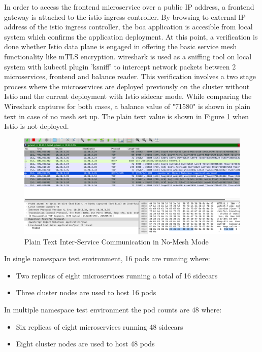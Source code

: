 In order to access the frontend microservice over a public IP address, a frontend gateway is attached to the istio ingress controller. By browsing to external IP address of the istio ingress controller, the \acrshort{boa} application is accesible from local system which confirms the application deployment. At this point, a verification is done whether Istio data plane is engaged in offering the basic service mesh functionality like mTLS encryption. \gls{wireshark} is used as a sniffing tool on local system with kubectl plugin 'ksniff' to intercept network packets between 2 microservices, frontend and balance reader. This verification involves a two stage process where the microservices are deployed previously on the cluster without Istio and the current deployment with Istio sidecar mode. While comparing the Wireshark captures for both cases, a balance value of "71580" is shown in plain text in case of no mesh set up. The plain text value is shown in Figure \ref{method:plainTxtWiresharkView} when Istio is not deployed.

\begin{figure}[ht!]
    \centering
    \includegraphics[width=1.0\linewidth]{resources/raw-balance-value.png}
    \caption{Plain Text Inter-Service Communication in No-Mesh Mode}
    \label{method:plainTxtWiresharkView}
\end{figure}

In single namespace test environment, 16 pods are running where:
\begin{itemize}
  \item Two replicas of eight microservices running a total of 16 sidecars
  \item Three cluster nodes are used to host 16 pods
\end{itemize}

In multiple namespace test environment the pod counts are 48 where:
\begin{itemize}
  \item Six replicas of eight microservices running 48 sidecars
  \item Eight cluster nodes are used to host 48 pods
\end{itemize}


